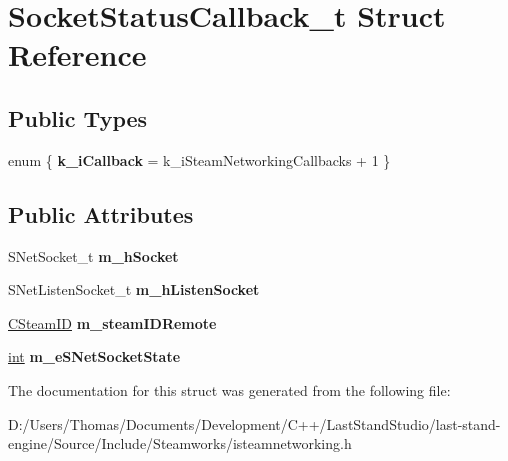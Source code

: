 \hypertarget{structSocketStatusCallback__t}{}\section{Socket\+Status\+Callback\+\_\+t Struct Reference}
\label{structSocketStatusCallback__t}
\subsection*{Public Types}
\begin{DoxyCompactItemize}
\item 
\hypertarget{structSocketStatusCallback__t_a145630f8e60930fffe8fe0a5ab723f87}{}enum \{ {\bfseries k\+\_\+i\+Callback} = k\+\_\+i\+Steam\+Networking\+Callbacks + 1
 \}\label{structSocketStatusCallback__t_a145630f8e60930fffe8fe0a5ab723f87}

\end{DoxyCompactItemize}
\subsection*{Public Attributes}
\begin{DoxyCompactItemize}
\item 
\hypertarget{structSocketStatusCallback__t_ad7ee7cafc0fdcd80c4371a5d8cea4eaf}{}S\+Net\+Socket\+\_\+t {\bfseries m\+\_\+h\+Socket}\label{structSocketStatusCallback__t_ad7ee7cafc0fdcd80c4371a5d8cea4eaf}

\item 
\hypertarget{structSocketStatusCallback__t_aad845fed84c16d48859c9f4951f50f13}{}S\+Net\+Listen\+Socket\+\_\+t {\bfseries m\+\_\+h\+Listen\+Socket}\label{structSocketStatusCallback__t_aad845fed84c16d48859c9f4951f50f13}

\item 
\hypertarget{structSocketStatusCallback__t_ab661a13380c1b462aa930868c7bb1910}{}\hyperlink{classCSteamID}{C\+Steam\+I\+D} {\bfseries m\+\_\+steam\+I\+D\+Remote}\label{structSocketStatusCallback__t_ab661a13380c1b462aa930868c7bb1910}

\item 
\hypertarget{structSocketStatusCallback__t_aa6d1d67a89034b140b79986172109837}{}\hyperlink{SDL__thread_8h_a6a64f9be4433e4de6e2f2f548cf3c08e}{int} {\bfseries m\+\_\+e\+S\+Net\+Socket\+State}\label{structSocketStatusCallback__t_aa6d1d67a89034b140b79986172109837}

\end{DoxyCompactItemize}


The documentation for this struct was generated from the following file\+:\begin{DoxyCompactItemize}
\item 
D\+:/\+Users/\+Thomas/\+Documents/\+Development/\+C++/\+Last\+Stand\+Studio/last-\/stand-\/engine/\+Source/\+Include/\+Steamworks/isteamnetworking.\+h\end{DoxyCompactItemize}
